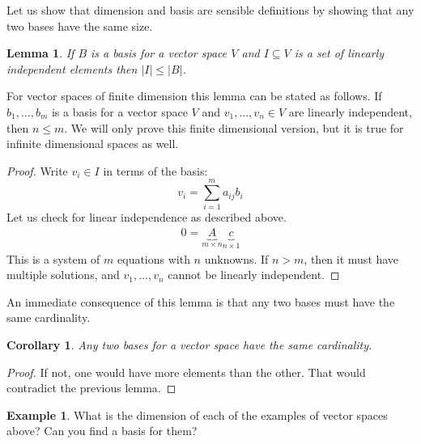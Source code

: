 \documentclass[12pt,reqno]{amsart}
\newtheorem{corollary}{Corollary}[section]
\newtheorem{lemma}{Lemma}[section]
\theoremstyle{definition}
\newtheorem{example}{Example}[section]
\begin{document}
Let us show that dimension and basis are sensible definitions by
showing that any two bases have the same size. 
\begin{lemma}
  If $B$ is a basis for a vector space $V$ and $I \subseteq V$ is a
  set of linearly independent elements then $|I| \leq |B|$. 
\end{lemma}
For vector spaces of finite dimension this lemma can be stated as
follows. If $b_1,..., b_m$ is a basis for a vector space $V$ and $v_1,
..., v_n\in V$ are linearly independent, then $n \leq m$. We will only
prove this finite dimensional version, but it is true for infinite
dimensional spaces as well.
\begin{proof}
  Write $v_i \in I$ in terms of the basis:
  \[ v_i = \sum_{i=1}^m a_{ij} b_i \]
  Let us check for linear independence as described above. 
  \begin{align*}
    0 = \underbrace{A}_{m \times n} \underbrace{c}_{n \times 1}    
  \end{align*}
  This is a system of $m$ equations with $n$ unknowns. If $n>m$, then
  it must have multiple solutions, and $v_1,...,v_n$ cannot be
  linearly independent.
\end{proof}
An immediate consequence of this lemma is that any two bases must have
the same cardinality. 
\begin{corollary}
  Any two bases for a vector space have the same cardinality.
\end{corollary}
\begin{proof}
  If not, one would have more elements than the other. That would
  contradict the previous lemma.
\end{proof}

\begin{example} 
  What is the dimension of each of the examples of vector spaces
  above? Can you find a basis for them? 
\end{example}
\end{document}
